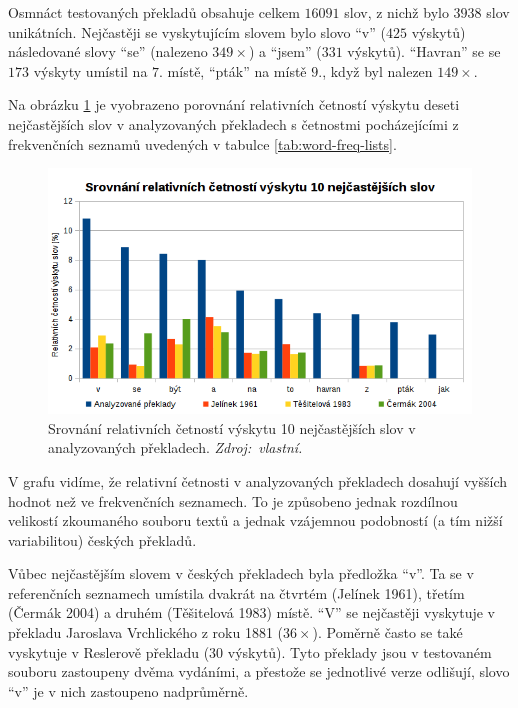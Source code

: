 \documentclass[dp.tex]{subfiles}
\begin{document}
Osmnáct testovaných překladů obsahuje celkem $16 091$ slov, z nichž bylo $3938$ slov unikátních. Nejčastěji se vyskytujícím slovem bylo slovo \enquote{v} ($425$ výskytů) následované slovy \enquote{se} (nalezeno $349\times$) a \enquote{jsem} ($331$ výskytů). \enquote{Havran} se se $173$ výskyty umístil na $7.$ místě, \enquote{pták} na místě $9.$, když byl nalezen $149\times$.

Na obrázku \ref{fig:word-freq} je vyobrazeno porovnání relativních četností výskytu deseti nejčastějších slov v analyzovaných překladech s četnostmi pocházejícími z frekvenčních seznamů uvedených v tabulce \ref{tab:word-freq-lists}.

\begin{figure}[h!]
	\centering
	\includegraphics[max width=\textwidth,keepaspectratio=true]{imgs-70-prakticka/cetnost-slov}
	\caption[Srovnání relativních četností výskytu 10 nejčastějších slov v analyzovaných překladech.]{Srovnání relativních četností výskytu 10 nejčastějších slov v analyzovaných překladech. \textit{Zdroj:~vlastní.}}
	\label{fig:word-freq}
\end{figure}

V grafu vidíme, že relativní četnosti v analyzovaných překladech dosahují vyšších hodnot než ve frekvenčních seznamech. To je způsobeno jednak rozdílnou velikostí zkoumaného souboru textů a jednak vzájemnou podobností (a tím nižší variabilitou) českých překladů. 

Vůbec nejčastějším slovem v českých překladech byla předložka \enquote{v}. Ta se v referenčních seznamech umístila dvakrát na čtvrtém (Jelínek 1961), třetím (Čermák 2004) a druhém (Těšitelová 1983) místě. \enquote{V} se nejčastěji vyskytuje v překladu Jaroslava Vrchlického z roku 1881 ($36\times$). Poměrně často se také vyskytuje v Reslerově překladu ($30$ výskytů). Tyto překlady jsou v testovaném souboru zastoupeny dvěma vydáními, a přestože se jednotlivé verze odlišují, slovo \enquote{v} je v nich zastoupeno nadprůměrně.
\end{document}
